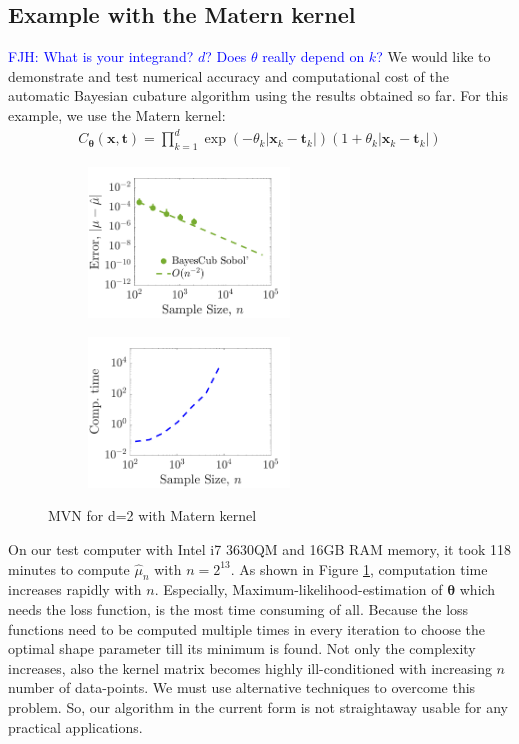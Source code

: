 \documentclass[twocolumn]{svjour3}          %
\newcommand{\bm}[1]{\boldsymbol{#1}}
\newcommand{\vtheta}{{\bm{\theta}}}
\newcommand{\vt}{\bm{t}}
\newcommand{\vx}{\bm{x}}
\newcommand{\hmu}{\widehat{\mu}}
\newcommand{\FJHNote}[1]{{\textcolor{blue}{FJH: #1}}}
\begin{document}
\subsection{Example with the Matern kernel}


\FJHNote{What is your integrand?  $d$?  Does $\theta$ really depend on $k$?}  We would like to demonstrate and test numerical accuracy and computational cost of the automatic {Bayesian cubature algorithm} using the results obtained so far.
For this example, we use the Matern kernel:
\begin{align}
\label{matern_kernel}
C_{\vtheta}(\vx, \vt) = \prod_{k=1}^d \exp(-\theta_k|\vx_k-\vt_k|)(1+\theta_k |\vx_k-\vt_k|)
\end{align}



\begin{figure}[htp]
\captionsetup[subfigure]{labelformat=empty}
\centering
\begin{subfigure}[b]{0.49\textwidth}
\includegraphics[height=4cm]{MVNBayesianWtSobol}
\end{subfigure}
\centering
\begin{subfigure}[b]{0.49\textwidth}
\includegraphics[height=4cm]{MVN_bayesianCubaturecomputeTime}
\end{subfigure}
\caption{MVN for d=2 with Matern kernel  }
\label{fig:MVN_Metern_d2b2}
\end{figure}
On our test computer with Intel i7 3630QM and 16GB RAM memory, it took 118 minutes to compute $\hmu_n$ with $n=2^{13}$. As shown in Figure \ref{fig:MVN_Metern_d2b2}, computation time increases rapidly with $n$. 
Especially, Maximum-likelihood-estimation of $\vtheta$ which needs the loss function, is the most time consuming of all. 
Because the loss functions need to be computed multiple times in every iteration to choose the optimal shape parameter till its minimum is found. 
Not only the complexity increases, also the kernel matrix becomes highly ill-conditioned with increasing $n$ number of data-points.
We must use alternative techniques to overcome this problem.
So, our algorithm in the current form is not straightaway usable for any practical applications.
\end{document}
